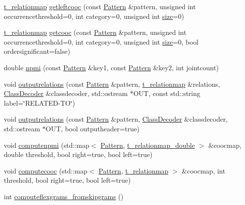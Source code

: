 \begin{DoxyCompactItemize}
\item 
\hyperlink{patternmodel_8h_a8695a2b10be5a74c827cd6c11bd46fb9}{t\+\_\+relationmap} \hyperlink{classIndexedPatternModel_a9f9292a132bac92267f26eeae00fd8ee}{getleftcooc} (const \hyperlink{classPattern}{Pattern} \&pattern, unsigned int occurrencethreshold=0, int category=0, unsigned int \hyperlink{classPatternModel_a25f387acaf981af9962195bd05b3e7e2}{size}=0)
\item 
\hyperlink{patternmodel_8h_a8695a2b10be5a74c827cd6c11bd46fb9}{t\+\_\+relationmap} \hyperlink{classIndexedPatternModel_aaa6caa3a7aa9ce15087b98dd8d2b1c4b}{getcooc} (const \hyperlink{classPattern}{Pattern} \&pattern, unsigned int occurrencethreshold=0, int category=0, unsigned int \hyperlink{classPatternModel_a25f387acaf981af9962195bd05b3e7e2}{size}=0, bool ordersignificant=false)
\item 
double \hyperlink{classIndexedPatternModel_a03c138c720ca2724457f2786626478d3}{npmi} (const \hyperlink{classPattern}{Pattern} \&key1, const \hyperlink{classPattern}{Pattern} \&key2, int jointcount)
\item 
void \hyperlink{classIndexedPatternModel_a001c634d095eee8883e8cd8fd24846d8}{outputrelations} (const \hyperlink{classPattern}{Pattern} \&pattern, \hyperlink{patternmodel_8h_a8695a2b10be5a74c827cd6c11bd46fb9}{t\+\_\+relationmap} \&relations, \hyperlink{classClassDecoder}{Class\+Decoder} \&classdecoder, std\+::ostream $\ast$O\+U\+T, const std\+::string label=\char`\"{}R\+E\+L\+A\+T\+E\+D-\/T\+O\char`\"{})
\item 
void \hyperlink{classIndexedPatternModel_abfe968ebfe686a774ae70c810d2d9cc3}{outputrelations} (const \hyperlink{classPattern}{Pattern} \&pattern, \hyperlink{classClassDecoder}{Class\+Decoder} \&classdecoder, std\+::ostream $\ast$O\+U\+T, bool outputheader=true)
\item 
void \hyperlink{classIndexedPatternModel_ab07346735ccdee4d7e42043e95d1bc2e}{computenpmi} (std\+::map$<$ \hyperlink{classPattern}{Pattern}, \hyperlink{patternmodel_8h_ae13b52c8cf777358f19da17c90c7dac0}{t\+\_\+relationmap\+\_\+double} $>$ \&coocmap, double threshold, bool right=true, bool left=true)
\item 
void \hyperlink{classIndexedPatternModel_ae62d20c9507dee1edd2f133cf3de2a5f}{computecooc} (std\+::map$<$ \hyperlink{classPattern}{Pattern}, \hyperlink{patternmodel_8h_a8695a2b10be5a74c827cd6c11bd46fb9}{t\+\_\+relationmap} $>$ \&coocmap, int threshold, bool right=true, bool left=true)
\item 
int \hyperlink{classIndexedPatternModel_ad3b8e1405429aa869501f9117664b0d5}{computeflexgrams\+\_\+fromskipgrams} ()

\end{DoxyCompactItemize}
